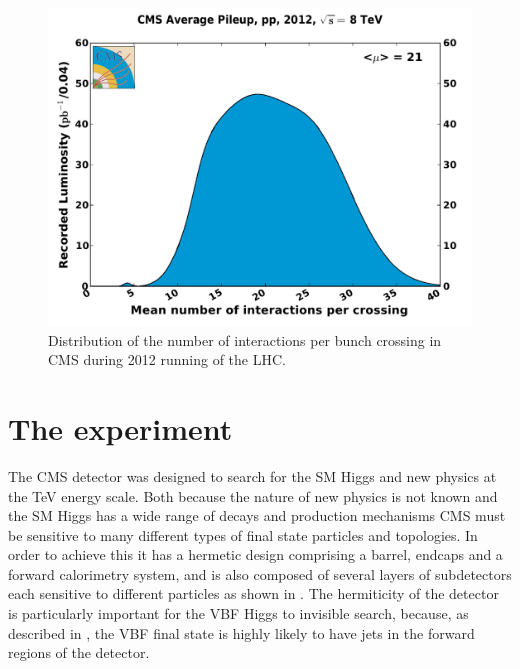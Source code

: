 \begin{figure}
  \includegraphics[width=1.2\largefigwidth]{plots/detector/pileup_pp_2012.pdf}
  \caption{Distribution of the number of interactions per bunch crossing in CMS during 2012 running of the LHC.\cite{CMSLumiPublic}}
  \label{fig:pusummary}
\end{figure}


\section{The \CMS experiment}
\label{sec:CMSInDetail}
The CMS detector was designed to search for the SM Higgs and new physics at the TeV energy scale. Both because the nature of new physics is not known and the SM Higgs has a wide range of decays and production mechanisms CMS must be sensitive to many different types of final state particles and topologies. In order to achieve this it has a hermetic design comprising a barrel, endcaps and a forward calorimetry system, and is also composed of several layers of subdetectors each sensitive to different particles as shown in . The hermiticity of the detector is particularly important for the VBF Higgs to invisible search, because, as described in , the VBF final state is highly likely to have jets in the forward regions of the detector.


